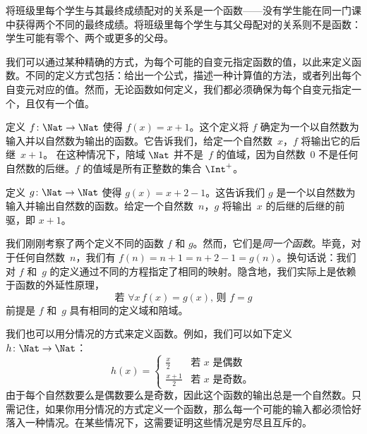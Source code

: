 \documentclass[../../../include/open-logic-section]{subfiles}
\begin{document}
\begin{ex}
将班级里每个学生与其最终成绩配对的关系是一个函数——没有学生能在同一门课中获得两个不同的最终成绩。将班级里每个学生与其父母配对的关系则不是函数：学生可能有零个、两个或更多的父母。
\end{ex}

\begin{explain}
我们可以通过某种精确的方式，为每个可能的自变元指定函数的值，以此来定义函数。不同的定义方式包括：给出一个公式，描述一种计算值的方法，或者列出每个自变元对应的值。然而，无论函数如何定义，我们都必须确保为每个自变元指定一个，且仅有一个值。
\end{explain}


\begin{ex}
定义 $f \colon \Nat \to \Nat$ 使得 $f(x) = x+1$。这个定义将 $f$ 确定为一个以自然数为输入并以自然数为输出的函数。它告诉我们，给定一个自然数~$x$，$f$ 将输出它的后继~$x+1$。
在这种情况下，陪域 $\Nat$ 并不是~$f$ 的值域，因为自然数~$0$ 不是任何自然数的后继。$f$ 的值域是所有正整数的集合 $\Int^{+}$。
\end{ex}

\begin{ex}
定义 $g \colon \Nat \to \Nat$ 使得 $g(x) = x+2-1$。这告诉我们 $g$ 是一个以自然数为输入并输出自然数的函数。给定一个自然数~$n$，$g$ 将输出~$x$ 的后继的后继的前驱，即 $x+1$。
\end{ex}

\begin{explain}
我们刚刚考察了两个定义不同的函数 $f$ 和 $g$。然而，它们是\emph{同一个函数}。毕竟，对于任何自然数~$n$，我们有 $f(n) = n+1 = n+2-1 =
g(n)$。换句话说：我们对 $f$ 和~$g$ 的定义通过不同的方程指定了相同的映射。隐含地，我们实际上是依赖于函数的外延性原理，
\[
  \text{若 }\forall x\, f(x) = g(x)\text{, 则 }f = g
\]
前提是 $f$ 和~$g$ 具有相同的定义域和陪域。
\end{explain}

\begin{ex}
我们也可以用分情况的方式来定义函数。例如，我们可以如下定义 $h \colon \Nat \to \Nat$：
\[
h(x) =
\begin{cases}
  \frac{x}{2} & \text{若 $x$ 是偶数} \\
  \frac{x+1}{2} & \text{若 $x$ 是奇数。}
\end{cases}
\]
由于每个自然数要么是偶数要么是奇数，因此这个函数的输出总是一个自然数。只需记住，如果你用分情况的方式定义一个函数，那么每一个可能的输入都必须恰好落入一种情况。在某些情况下，这需要证明这些情况是穷尽且互斥的。
\end{ex}
\end{document}
